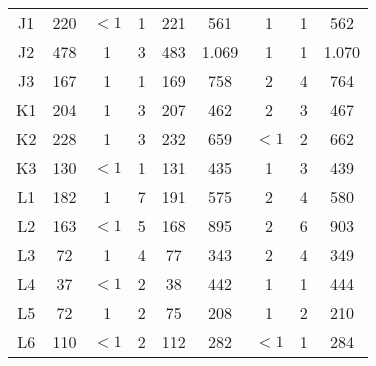 \begin{center}
\begin{longtable}{ccccc|cccc}
    J1    & 220   & $<1$     & 1     & 221   & 561   & 1     & 1     & 562 \\
    J2    & 478   & 1     & 3     & 483   & 1.069 & 1     & 1     & 1.070 \\
    J3    & 167   & 1     & 1     & 169   & 758   & 2     & 4     & 764 \\
    K1    & 204   & 1     & 3     & 207   & 462   & 2     & 3     & 467 \\
    K2    & 228   & 1     & 3     & 232   & 659   & $<1$     & 2     & 662 \\
    K3    & 130   & $<1$     & 1     & 131   & 435   & 1     & 3     & 439 \\
    L1    & 182   & 1     & 7     & 191   & 575   & 2     & 4     & 580 \\
    L2    & 163   & $<1$     & 5     & 168   & 895   & 2     & 6     & 903 \\
    L3    & 72    & 1     & 4     & 77    & 343   & 2     & 4     & 349 \\
    L4    & 37    & $<1$     & 2     & 38    & 442   & 1     & 1     & 444 \\
    L5    & 72    & 1     & 2     & 75    & 208   & 1     & 2     & 210 \\
    L6    & 110   & $<1$     & 2     & 112   & 282   & $<1$     & 1     & 284 \\
\end{longtable}
\end{center}

